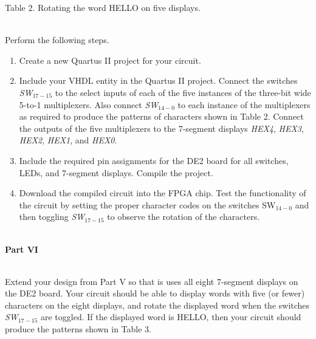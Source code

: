 \documentclass[psfig,10pt,fullpage]{article}
\begin{document}
\begin{center}
Table 2. Rotating the word HELLO on five displays.
\end{center}
~\\

Perform the following steps.
\begin{enumerate}
\item Create a new Quartus II project for your circuit.
\item Include your VHDL entity in the Quartus II project. Connect the switches 
{\it SW}$_{17-15}$ to the select inputs of each of the five instances of the three-bit 
wide 5-to-1 multiplexers. Also connect {\it SW}$_{14-0}$ to each instance of the
multiplexers as required to produce the patterns of characters shown in Table 2.
Connect the outputs of the five multiplexers to the 7-segment displays {\it HEX4}, 
{\it HEX3}, {\it HEX2}, {\it HEX1}, and {\it HEX0}.
\item Include the required pin assignments for the DE2 board for all switches, LEDs, 
and 7-segment displays. Compile the project.
\item Download the compiled circuit into the FPGA chip. Test the functionality of the 
circuit by setting the proper character codes on the switches SW$_{14-0}$ and then 
toggling {\it SW}$_{17-15}$ to observe the rotation of the characters.
\end{enumerate}

~\\
\noindent
{\bf Part VI}

~\\
\noindent
Extend your design from Part V so that is uses all eight 7-segment displays on the DE2
board. Your circuit should be able to display words with five (or fewer) characters 
on the eight displays, and rotate the displayed word when the switches {\it SW}$_{17-15}$ 
are toggled. If the displayed word is HELLO, then your circuit should produce the patterns 
shown in Table 3.
\end{document}
